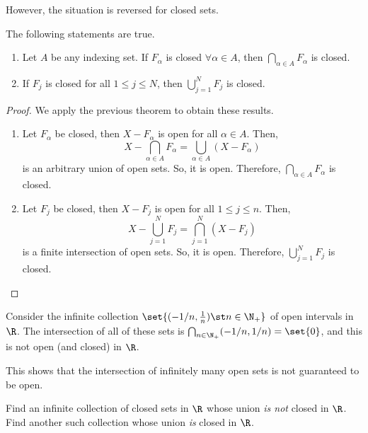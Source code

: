 However, the situation is reversed for closed sets.
\begin{nthm}
  The following statements are true.
  \begin{enumerate}
  \item Let $A$ be any indexing set. If $F_{\alpha}$ is closed $\forall\alpha\in A$, then $\bigcap_{\alpha\in A} F_{\alpha}$ is closed.
  \item If $F_{j}$ is closed for all $1 \leq j \leq N$, then $\bigcup_{j=1}^{N} F_{j}$ is closed.
  \end{enumerate}
\end{nthm}
\begin{proof}
  We apply the previous theorem to obtain these results.
  \begin{enumerate}
  \item Let $F_{\alpha}$ be closed, then $X-F_{\alpha}$ is open for all $\alpha \in A$. Then,
  \begin{equation*}
    X - \bigcap_{\alpha\in A} F_{\alpha}
    =  \bigcup_{\alpha\in A} \left(X - F_{\alpha}\right)
  \end{equation*}
  is an arbitrary union of open sets. So, it is open. Therefore, $\bigcap_{\alpha\in A} F_{\alpha}$ is closed.

  \item Let $F_{j}$ be closed, then $X-F_{j}$ is open for all $1 \leq j \leq n$. Then,
  \begin{equation*}
    X - \bigcup_{j=1}^{N} F_{j}
    =  \bigcap_{j=1}^{N} \left(X - F_{j}\right)
  \end{equation*}
  is a finite intersection of open sets. So, it is open. Therefore, $\bigcup_{j=1}^{N} F_{j}$ is closed.
  \end{enumerate}
\end{proof}

\begin{negg}
  Consider the infinite collection $\set{(-1/n, \frac{1}{n}) \st n \in \N_{+}}$ of open intervals in $\R$. The intersection of all of these sets is $\bigcap_{n \in \N_{+}} (-1/n, 1/n) = \set{0}$, and this is not open (and closed) in $\R$.

  This shows that the intersection of infinitely many open sets is not guaranteed to be open.
\end{negg}

\begin{nex}
  Find an infinite collection of closed sets in $\R$ whose union \emph{is not} closed in $\R$. Find another such collection whose union \emph{is} closed in $\R$.
\end{nex}

